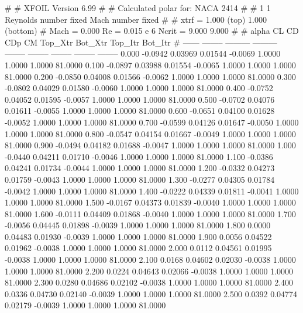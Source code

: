 #  
#       XFOIL         Version 6.99
#  
# Calculated polar for: NACA 2414                                       
#  
# 1 1 Reynolds number fixed          Mach number fixed         
#  
# xtrf =   1.000 (top)        1.000 (bottom)  
# Mach =   0.000     Re =     0.015 e 6     Ncrit =   9.000  9.000
#  
#   alpha    CL        CD       CDp       CM     Top_Xtr  Bot_Xtr  Top_Itr  Bot_Itr
#  ------ -------- --------- --------- -------- -------- -------- -------- --------
   0.000  -0.0942   0.03969   0.01544  -0.0069   1.0000   1.0000   1.0000  81.0000
   0.100  -0.0897   0.03988   0.01554  -0.0065   1.0000   1.0000   1.0000  81.0000
   0.200  -0.0850   0.04008   0.01566  -0.0062   1.0000   1.0000   1.0000  81.0000
   0.300  -0.0802   0.04029   0.01580  -0.0060   1.0000   1.0000   1.0000  81.0000
   0.400  -0.0752   0.04052   0.01595  -0.0057   1.0000   1.0000   1.0000  81.0000
   0.500  -0.0702   0.04076   0.01611  -0.0055   1.0000   1.0000   1.0000  81.0000
   0.600  -0.0651   0.04100   0.01628  -0.0052   1.0000   1.0000   1.0000  81.0000
   0.700  -0.0599   0.04126   0.01647  -0.0050   1.0000   1.0000   1.0000  81.0000
   0.800  -0.0547   0.04154   0.01667  -0.0049   1.0000   1.0000   1.0000  81.0000
   0.900  -0.0494   0.04182   0.01688  -0.0047   1.0000   1.0000   1.0000  81.0000
   1.000  -0.0440   0.04211   0.01710  -0.0046   1.0000   1.0000   1.0000  81.0000
   1.100  -0.0386   0.04241   0.01734  -0.0044   1.0000   1.0000   1.0000  81.0000
   1.200  -0.0332   0.04273   0.01759  -0.0043   1.0000   1.0000   1.0000  81.0000
   1.300  -0.0277   0.04305   0.01784  -0.0042   1.0000   1.0000   1.0000  81.0000
   1.400  -0.0222   0.04339   0.01811  -0.0041   1.0000   1.0000   1.0000  81.0000
   1.500  -0.0167   0.04373   0.01839  -0.0040   1.0000   1.0000   1.0000  81.0000
   1.600  -0.0111   0.04409   0.01868  -0.0040   1.0000   1.0000   1.0000  81.0000
   1.700  -0.0056   0.04445   0.01898  -0.0039   1.0000   1.0000   1.0000  81.0000
   1.800   0.0000   0.04483   0.01930  -0.0039   1.0000   1.0000   1.0000  81.0000
   1.900   0.0056   0.04522   0.01962  -0.0038   1.0000   1.0000   1.0000  81.0000
   2.000   0.0112   0.04561   0.01995  -0.0038   1.0000   1.0000   1.0000  81.0000
   2.100   0.0168   0.04602   0.02030  -0.0038   1.0000   1.0000   1.0000  81.0000
   2.200   0.0224   0.04643   0.02066  -0.0038   1.0000   1.0000   1.0000  81.0000
   2.300   0.0280   0.04686   0.02102  -0.0038   1.0000   1.0000   1.0000  81.0000
   2.400   0.0336   0.04730   0.02140  -0.0039   1.0000   1.0000   1.0000  81.0000
   2.500   0.0392   0.04774   0.02179  -0.0039   1.0000   1.0000   1.0000  81.0000
